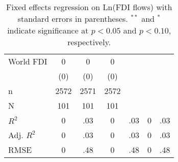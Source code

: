 \begin{table}[ht]
{\begin{tabular}{lccc}
  World FDI & 0 & 0 & 0 \\ 
   & (0) & (0) & (0) \\ 
   \hline
n & 2572 & 2571 & 2572 \\ 
  N & 101 & 101 & 101 \\ 
  $R^{2}$ & 0&.03 & 0&.03 & 0&.03 \\ 
  Adj. $R^{2}$ & 0&.03 & 0&.03 & 0&.03 \\ 
  RMSE & 0&.48 & 0&.48 & 0&.48 \\ 
   \hline
\hline
\end{tabular}
}
\caption{Fixed effects regression on Ln(FDI flows) with standard errors in parentheses. $^{**}$ and $^{*}$ indicate significance at $p< 0.05 $ and $p< 0.10 $, respectively.} 
\end{table}

